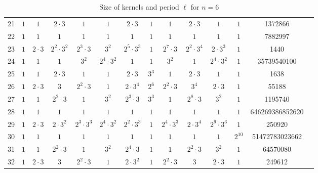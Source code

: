 {\begin{table}
\begin{center}
\begin{adjustbox}{max width=\textwidth}
\begin{tabular}{|c|cccccccccccc|c|}
21 &$1$ &$1$ &$2\cdot 3$ &$1$ &$1$ &$2\cdot 3$ &$1$ &$1$ &$2\cdot 3$ &$1$ &$1$ &1372866\\
22 &$1$ &$1$ &$1$ &$1$ &$1$ &$1$ &$1$ &$1$ &$1$ &$1$ &$1$ &7882997\\
23 &$1$ &$2\cdot 3$ &$2^{2}\cdot 3^{2}$ &$2^{3}\cdot 3$ &$3^{2}$ &$2^{5}\cdot 3^{3}$ &$1$ &$2^{7}\cdot 3$ &$2^{2}\cdot 3^{4}$ &$2\cdot 3^{3}$ &$1$ &1440\\
24 &$1$ &$1$ &$1$ &$3^{2}$ &$2^{4}\cdot 3^{2}$ &$1$ &$1$ &$3^{2}$ &$1$ &$2^{4}\cdot 3^{2}$ &$1$ &35739540100\\
25 &$1$ &$1$ &$2\cdot 3$ &$1$ &$1$ &$2\cdot 3$ &$3^{3}$ &$1$ &$2\cdot 3$ &$1$ &$1$ &1638\\
26 &$1$ &$2\cdot 3$ &$3$ &$2^{2}\cdot 3$ &$1$ &$2\cdot 3^{4}$ &$2^{6}$ &$2^{2}\cdot 3$ &$3^{4}$ &$2\cdot 3$ &$1$ &55188\\
27 &$1$ &$1$ &$2^{2}\cdot 3$ &$1$ &$3^{2}$ &$2^{3}\cdot 3$ &$3^{3}$ &$1$ &$2^{8}\cdot 3$ &$3^{2}$ &$1$ &1195740\\
28 &$1$ &$1$ &$1$ &$1$ &$1$ &$1$ &$1$ &$1$ &$1$ &$1$ &$1$ &646269386852620\\
29 &$1$ &$2\cdot 3$ &$2\cdot 3^{2}$ &$2^{3}\cdot 3^{3}$ &$2^{4}\cdot 3^{2}$ &$2^{2}\cdot 3^{3}$ &$1$ &$2^{4}\cdot 3^{3}$ &$2\cdot 3^{4}$ &$2^{9}\cdot 3^{3}$ &$1$ &250920\\
30 &$1$ &$1$ &$1$ &$1$ &$1$ &$1$ &$1$ &$1$ &$1$ &$1$ &$2^{10}$&51472783023662\\
31 &$1$ &$1$ &$2^{2}\cdot 3$ &$1$ &$3^{2}$ &$2^{4}\cdot 3$ &$1$ &$1$ &$2^{2}\cdot 3$ &$3^{2}$ &$1$ &64570080\\
32 &$1$ &$2\cdot 3$ &$3$ &$2^{2}\cdot 3$ &$1$ &$2\cdot 3^{2}$ &$1$ &$2^{2}\cdot 3$ &$3$ &$2\cdot 3$ &$1$ &249612\\
      \hline
    \end{tabular}
    \end{adjustbox}
  \end{center}
  \caption{Size of kernels and period $\ell$ for $n=6$}
\end{table}

}
